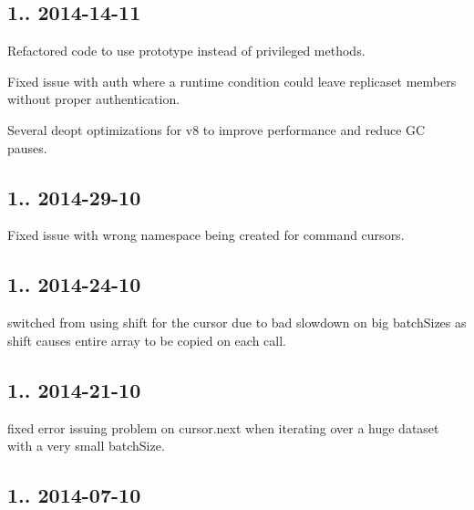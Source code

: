 \subsection*{1.. 2014-\/14-\/11 }


\begin{DoxyItemize}
\item Refactored code to use prototype instead of privileged methods.
\item Fixed issue with auth where a runtime condition could leave replicaset members without proper authentication.
\item Several deopt optimizations for v8 to improve performance and reduce GC pauses.
\end{DoxyItemize}

\subsection*{1.. 2014-\/29-\/10 }


\begin{DoxyItemize}
\item Fixed issue with wrong namespace being created for command cursors.
\end{DoxyItemize}

\subsection*{1.. 2014-\/24-\/10 }


\begin{DoxyItemize}
\item switched from using shift for the cursor due to bad slowdown on big batch\+Sizes as shift causes entire array to be copied on each call.
\end{DoxyItemize}

\subsection*{1.. 2014-\/21-\/10 }


\begin{DoxyItemize}
\item fixed error issuing problem on cursor.\+next when iterating over a huge dataset with a very small batch\+Size.
\end{DoxyItemize}

\subsection*{1.. 2014-\/07-\/10 }



